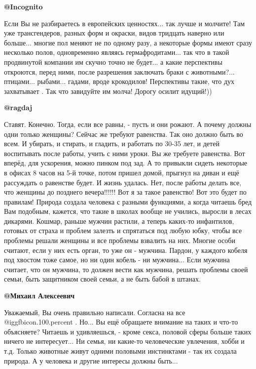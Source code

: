 \begin{itemize}
\textbf{@Incognito}  

Если Вы не разбираетесь в европейских ценностях... так лучше и молчите! Там уже
трансгендеров, разных форм и окраски, видов тридцать наверно или
больше... многие пол меняют не по одному разу, а некоторые формы имеют сразу
несколько полов, одновременно являясь гермафродитами... так что в такой
продвинутой компании им скучно точно не будет... а какие перспективы откроются,
перед ними, после разрешения заключать браки с
животными?... птицами... рыбами... гадами, вроде крокодилов! Перспективы такие,
что дух захватывает . Так что завидуйте им молча! Дорогу осилит идущий!))

\textbf{@ragdaj}  

Ставят. Конечно. Тогда, если все равны, - пусть и они рожают. А почему должны
одни только женщины?  Сейчас же  требуют равенства. Так оно должно быть во
всем. И убирать, и стирать, и гладить,  и работать по 30-35 лет,  и детей
воспитывать после работы, учить с ними уроки. Вы же требуете равенства. Вот
вперёд, для ускорения, можно пинком под зад. А то привыкли сидеть некоторые в
офисах 8 часов на 5-й точке, потом пришел домой, прыгнул на диван и ещё
рассуждать о равенстве будет.  И жизнь удалась. Нет, после работы делать все,
что женщины до позднего вечера!!!!!! Вот я за такое равенство! Вот это будет
по правилам! Природа создала человека с разными функциями, а когда читаешь
бред Вам подобным, кажется, что такие в школах вообще не учились, выросли в
лесах дикарями. Кошмар, раньше мужчин растили, а теперь каких-то инфантилов,
готовых от страха и проблем залезть и спрятаться под любую юбку, чтобы все
проблемы решали женщины и все проблемы взвалить на  них. Многие особи считают,
если у них есть орган, то уже он - мужчина. Пардон, у каждого кобеля под
хвостом тоже самое, но ни один кобель - ни мужчина... Если мужчина считает,
что он мужчина, то должен вести как мужчина, решать проблемы своей семьи, быть
защитником своей семьи, а не быть бабой в штанах. 

\textbf{@Михаил Алексеевич}  

Уважаемый, Вы очень правильно написали. Согласна на все  @igg{fbicon.100.percent} . Но...  Вы ещё
обращаете внимание на таких и что-то объясняете? Читаешь и удивляешься, -
кроме секса, половой сферы больше таких  ничего не интересует... Ни семья, ни
какие-то человеческие увлечения, хобби и т.д. Только животные живут одними
половыми инстинктами - так их создала природа. А у человека и другие интересы
должны быть...


\end{itemize}
